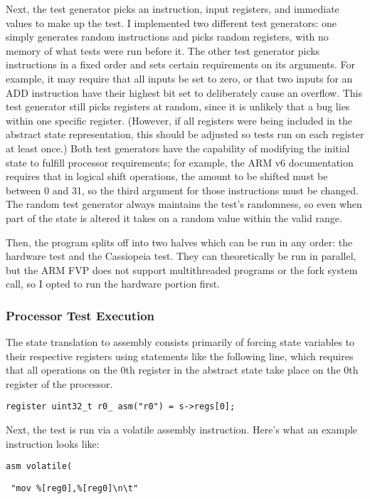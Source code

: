 \documentclass[letterpaper,12pt]{article}
\begin{document}
Next, the test generator picks an instruction, input registers, and immediate values to make up the test. I implemented two different test generators: one simply generates random instructions and picks random registers, with no memory of what tests were run before it. The other test generator picks instructions in a fixed order and sets certain requirements on its arguments. For example, it may require that all inputs be set to zero, or that two inputs for an ADD instruction have their highest bit set to deliberately cause an overflow. This test generator still picks registers at random, since it is unlikely that a bug lies within one specific register. (However, if all registers were being included in the abstract state representation, this should be adjusted so tests run on each register at least once.) Both test generators have the capability of modifying the initial state to fulfill processor requirements; for example, the ARM v6 documentation requires that in logical shift operations, the amount to be shifted must be between 0 and 31, so the third argument for those instructions must be changed. The random test generator always maintains the test's randomness, so even when part of the state is altered it takes on a random value within the valid range.

Then, the program splits off into two halves which can be run in any order: the hardware test and the Cassiopeia test. They can theoretically be run in parallel, but the ARM FVP does not support multithreaded programs or the fork system call, so I opted to run the hardware portion first. 

\subsubsection{Processor Test Execution}

The state translation to assembly consists primarily of forcing state variables to their respective registers using statements like the following line, which requires that all operations on the 0th register in the abstract state take place on the 0th register of the processor.

\texttt{register uint32\_t r0\_ asm("r0") = s->regs[0];}

Next, the test is run via a volatile assembly instruction. Here's what an example instruction looks like:

\texttt{asm volatile(}

\texttt{\ "mov \%[reg0],\%[reg0]\textbackslash n\textbackslash t"}
\end{document}
